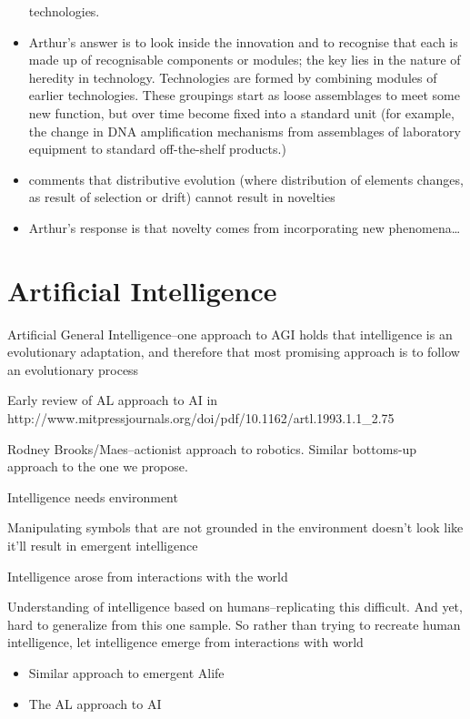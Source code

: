 \begin{itemize}
	      technologies.
	\item
	      Arthur's answer is to look inside the innovation and to recognise
	      that each is made up of recognisable components or modules; the key
	      lies in the nature of heredity in technology. Technologies are
	      formed by combining modules of earlier technologies. These groupings
	      start as loose assemblages to meet some new function, but over time
	      become fixed into a standard unit (for example, the change in DNA
	      amplification mechanisms from assemblages of laboratory equipment to
	      standard off-the-shelf products.)
	\item
	      \autocite{Bourrat2015} comments that distributive evolution (where
	      distribution of elements changes, as result of selection or drift)
	      cannot result in novelties
	\item
	      Arthur's response is that novelty comes from incorporating new
	      phenomena\ldots{}
\end{itemize}

\section{Artificial Intelligence}\label{ai}
Artificial General Intelligence--one approach to AGI holds that intelligence is an evolutionary adaptation, and therefore that most
promising approach is to follow an evolutionary process

Early review of AL approach to AI in http://www.mitpressjournals.org/doi/pdf/10.1162/artl.1993.1.1\_2.75

Rodney Brooks/Maes--actionist approach to robotics. Similar bottoms-up approach to the one we propose.

Intelligence needs environment

Manipulating symbols that are not grounded in the environment doesn't look like it'll result in emergent intelligence

Intelligence arose from interactions with the world

Understanding of intelligence based on humans--replicating this
difficult. And yet, hard to generalize from this one sample. So rather
than trying to recreate human intelligence, let intelligence emerge from
interactions with world

\begin{itemize}
	\item
	      Similar approach to emergent Alife
	\item
	      The AL approach to AI
\end{itemize}

